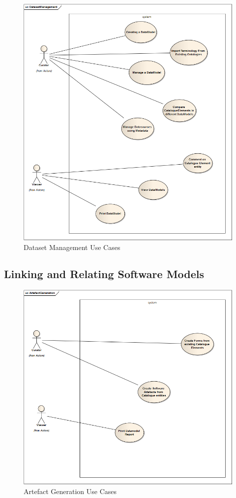 \documentclass{article}
\begin{document}
\begin{figure}[here]
	\includegraphics[scale=0.4]{diagrams/DatasetManagement}
	\caption{Dataset Management Use Cases} 
	\label{fig:datasetManagementUC}
\end{figure}


\subsection{Linking and Relating Software Models}

\begin{figure}[here]
	\includegraphics[scale=0.4]{diagrams/ArtefactGeneration}
	\caption{Artefact Generation Use Cases} 
	\label{fig:artefactUC}
\end{figure}
\end{document}
